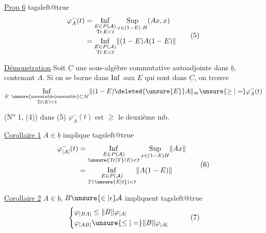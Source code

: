 \uline{Prop 6}  
\begingroup\csname tagsleft@true\endcsname
\[
\begin{aligned}
\varphi_A^-(t)&=\mathop{\rm Inf}\limits_{\substack{E\in P(\mathcal A)\\\mathrm{Tr}\,E<t}}
\mathop{\rm Sup}\limits_{x\in(1-E).H}(Ax,x)\\
&=\mathop{\rm Inf}\limits_{\substack{E\in P(\mathcal A)\\\mathrm{Tr}\,E<t}}\lVert(1-E)A(1-E)\rVert
\end{aligned}\tag*{(5)}
\]
\endgroup

\uline{Démonstration} Soit $\underline C$  une sous-algèbre commutative autoadjointe  dans $\underline b$, contenant $A$. Si on se borne dans  $\mathop{\rm Inf}$ aux $E$ qui sont dans $\underline C$, on trouve
\[
\mathop{\rm Inf}\limits_{\substack{E\ \text{\unsure{mesurable|ensemble}}\subset M\\\mathrm{Tr}(E)<t}}
\lVert(1-E)\deleted{\unsure{E}}A\rVert_\infty\unsure{\geq|=}\varphi_A^-(t)
\]
(N\textsuperscript{o} 1,  (4))   dans (5) $\varphi^-_A(t)$ est $\geq$ le deuxième mb.

 \uline{Corollaire 1} $A\in\underline b$ implique
\begingroup\csname tagsleft@true\endcsname
\[
\begin{aligned}
\varphi^-_{\lvert A\rvert}(t)&=\mathop{\rm Inf}\limits_{\substack{E\in P(\mathcal A)\\\unsure{\mathrm{Tr}|\mathrm T}(E)<t}}
\mathop{\rm Sup}\limits_{x\in(1-E)H}\lVert Ax\rVert\\
&=\mathop{\rm Inf}\limits_{\substack{E\in P(\mathcal A)\\T(\unsure{E|t})<t}}\lVert A(1-E)\rVert
\end{aligned}\tag*{(6)}
\]
\endgroup

\uline{Corollaire 2} $A\in\underline b$, $B\unsure{\in|\epsilon}\mathcal A$ impliquent
\begingroup\csname tagsleft@true\endcsname
\[
\begin{aligned}
&\left\{\begin{aligned}
\varphi_{\lvert BA\rvert}&\leq\lVert B\rVert\varphi_{\lvert A\rvert}\\
\varphi_{\lvert AB\rvert}&\unsure{\leq|=}\lVert B\rVert\varphi_{\lvert A\rvert}
\end{aligned}\right.
\end{aligned}\tag*{(7)}
\]
\endgroup


